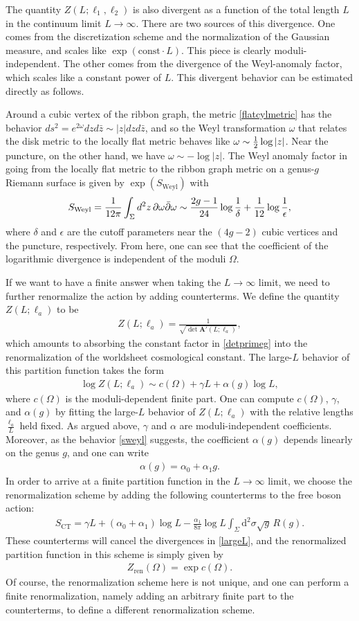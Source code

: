 \documentclass[12pt]{article}
\def\ie{\begin{equation}\begin{aligned}}
\def\fe{\end{aligned}\end{equation}}
\numberwithin{equation}{section}
\begin{document}
The quantity $Z(L;\ell_1, \ell_2)$ is also divergent as a function of the total length $L$ in the continuum limit $L\rightarrow \infty$. There are two sources of this divergence. One comes from the discretization scheme and the normalization of the Gaussian measure, and scales like $\exp(\text{const}\cdot L)$. This piece is clearly moduli-independent. The other comes from the divergence of the Weyl-anomaly factor, which scales like a constant power of $L$. This divergent behavior can be estimated directly as follows. 

Around a cubic vertex of the ribbon graph, the metric \eqref{flatcylmetric} has the behavior $ds^2 =e^{2\omega} dz d\bar z \sim |z| dz d\bar z$, and so the Weyl transformation $\omega$ that relates the disk metric to the locally flat metric behaves like $\omega \sim {1\over 2} \log|z|$. Near the puncture, on the other hand, we have $\omega \sim - \log|z|$. The Weyl anomaly factor in going from the locally flat metric to the ribbon graph metric on a genus-$g$ Riemann surface is given by $\exp({S_\text{Weyl}})$ with
\ie\label{sweyl}
S_\text{Weyl} = {1\over 12\pi} \int_{\Sigma} d^2z \,\partial\omega \bar\partial\omega \sim \frac{2g-1}{24}\log \frac{1}{\delta} +\frac{1}{12} \log \frac{1}{\epsilon},
\fe
where $\delta$ and $\epsilon$ are the cutoff parameters near the $(4g-2)$ cubic vertices and the puncture, respectively. From here, one can see that the coefficient of the logarithmic divergence is independent of the moduli $\Omega$.

If we want to have a finite answer when taking the $L\rightarrow \infty$ limit, we need to further renormalize the action by adding counterterms. We define the quantity $Z(L;\ell_a)$ to be
\ie
Z(L;\ell_a) = \frac{1}{\sqrt{\det \mathbf{A}'(L;\ell_a)}},
\fe
which amounts to absorbing the constant factor in \eqref{detprimeg} into the renormalization of the worldsheet cosmological constant. The large-$L$ behavior of this partition function takes the form
\ie\label{largeL}
\log Z(L;\ell_a) \sim c(\Omega) + \gamma L + \alpha(g) \log L,
\fe
where $c(\Omega)$ is the moduli-dependent finite part. One can compute $c(\Omega)$, $\gamma$, and $\alpha(g)$ by fitting the large-$L$ behavior of $Z(L;\ell_a)$ with the relative lengths $\tfrac{\ell_a}{L}$ held fixed. As argued above, $\gamma$ and $\alpha$ are moduli-independent coefficients. Moreover, as the behavior \eqref{sweyl} suggests, the coefficient $\alpha(g)$ depends linearly on the genus $g$, and one can write
\ie \alpha(g)=\alpha_0+\alpha_1 g.\fe
 In order to arrive at a finite partition function in the $L\rightarrow \infty$ limit, we choose the renormalization scheme by adding the following counterterms to the free boson action:
\ie
S_\text{CT} = \gamma L + (\alpha_0+\alpha_1)\log L- \frac{\alpha_1}{8\pi}\log L\int_\Sigma \mathrm{d}^2\sigma \sqrt{g}\, R(g).
\fe
These counterterms will cancel the divergences in \eqref{largeL}, and the renormalized partition function in this scheme is simply given by
\ie \label{renZ}
Z_\text{ren}(\Omega) = \exp c(\Omega).
\fe
Of course, the renormalization scheme here is not unique, and one can perform a finite renormalization, namely adding an arbitrary finite part to the counterterms, to define a different renormalization scheme.
\end{document}
